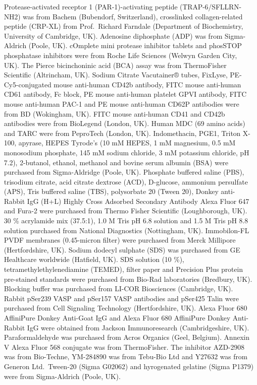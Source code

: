 \documentclass[11pt,twoside]{bristolthesis}
\begin{document}
Protease-activated receptor 1 (PAR-1)-activating peptide (TRAP-6/SFLLRN-NH2) was from Bachem (Bubendorf, Switzerland), crosslinked collagen-related peptide (CRP-XL) from Prof.~Richard Farndale (Department of Biochemistry, University of Cambridge, UK). Adenosine diphosphate (ADP) was from Sigma-Aldrich (Poole, UK). cOmplete mini protease inhibitor tablets and phosSTOP phosphatase inhibitors were from Roche Life Sciences (Welwyn Garden City, UK). The Pierce bicinchoninic acid (BCA) assay was from ThermoFisher Scientific (Altrincham, UK). Sodium Citrate Vacutainer® tubes, FixLyse, PE-Cy5-conjugated mouse anti-human CD42b antibody, FITC mouse anti-human CD61 antibody, Fc block, PE mouse anti-human platelet GPVI antibody, FITC mouse anti-human PAC-1 and PE mouse anti-human CD62P antibodies were from BD (Wokingham, UK). FITC mouse anti-human CD41 and CD42b antibodies were from BioLegend (London, UK). Human MDC (69 amino acids) and TARC were from PeproTech (London, UK). Indomethacin, PGE1, Triton X-100, apyrase, HEPES Tyrode's (10 mM HEPES, 1 mM magnesium, 0.5 mM monosodium phosphate, 145 mM sodium chloride, 3 mM potassium chloride, pH 7.2), 2-butanol, ethanol, methanol and bovine serum albumin (BSA) were purchased from Sigma-Aldridge (Poole, UK). Phosphate buffered saline (PBS), trisodium citrate, acid citrate dextrose (ACD), D-glucose, ammonium persulfate (APS), Tris buffered saline (TBS), polysorbate 20 (Tween 20), Donkey anti-Rabbit IgG (H+L) Highly Cross Adsorbed Secondary Antibody Alexa Fluor 647 and Fura-2 were purchased from Thermo Fisher Scientific (Loughborough, UK). 30 \% acrylamide mix (37.5:1), 1.0 M Tris pH 6.8 solution and 1.5 M Tris pH 8.8 solution purchased from National Diagnostics (Nottingham, UK). Immobilon-FL PVDF membranes (0.45-micron filter) were purchased from Merck Millipore (Hertfordshire, UK). Sodium dodecyl sulphate (SDS) was purchased from GE Healthcare worldwide (Hatfield, UK). SDS solution (10 \%), tetramethylethylenediamine (TEMED), filter paper and Precision Plus protein pre-stained standards were purchased from Bio-Rad laboratories (Bredbury, UK). Blocking buffer was purchased from LI-COR Biosciences (Cambridge, UK). Rabbit pSer239 VASP and pSer157 VASP antibodies and pSer425 Talin were purchased from Cell Signaling Technology (Hertfordshire, UK). Alexa Fluor 680 AffiniPure Donkey Anti-Goat IgG and Alexa Fluor 680 AffiniPure Donkey Anti-Rabbit IgG were obtained from Jackson Immunoresearch (Cambridgeshire, UK). Paraformaldehyde was purchased from Acros Organics (Geel, Belgium). Annexin V Alexa Fluor 568 conjugate was from ThermoFisher. The inhibitor AZD-2908 was from Bio-Techne, YM-284890 was from Tebu-Bio Ltd and Y27632 was from Generon Ltd.~Tween-20 (Sigma G02062) and hyrogenated gelatine (Sigma P1379) were from Sigma-Aldrich (Poole, UK).
\end{document}
